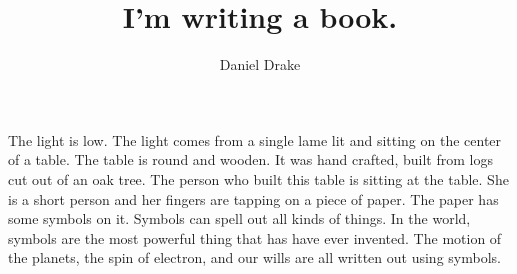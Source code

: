 \documentclass[12pt]{extarticle}
\title{I'm writing a book.}
\author{Daniel Drake}
\theoremstyle{plain}
\theoremstyle{plain}
\theoremstyle{plain}
\theoremstyle{Definition}
\theoremstyle{Definition}
\theoremstyle{Definition}
\theoremstyle{plain}
\theoremstyle{plain}
\begin{document}
	\maketitle

	\newpage
	
	The light is low. The light comes from a single lame lit and sitting on the center of a table. The table is round and wooden. It was hand crafted, built from logs cut out of an oak tree. The person who built this table is sitting at the table. She is a short person and her fingers are tapping on a piece of paper. The paper has some symbols on it. Symbols can spell out all kinds of things. In the world, symbols are the most powerful thing that has have ever invented. The motion of the planets, the spin of electron, and our wills are all written out using symbols. 
\end{document}
